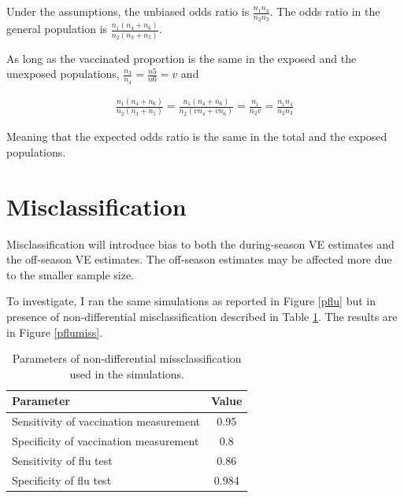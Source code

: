 \documentclass[12pt]{article}
\begin{document}
Under the assumptions, the unbiased odds ratio is $\frac{n_1n_4}{n_2n_3}$. The odds ratio in the general population is $\frac{n_1(n_4+n_6)}{n_2(n_3+n_5)}$.

As long as the vaccinated proportion is the same in the exposed and the unexposed populations, $\frac{n_3}{n_4} = \frac{n5}{n6}=v$ and

\begin{align}
\frac{n_1(n_4+n_6)}{n_2(n_3+n_5)} = \frac{n_1(n_4+n_6)}{n_2(vn_4+vn_6)}=\frac{n_1}{n_2v}=\frac{n_1n_4}{n_2n_3}
\end{align}

Meaning that the expected odds ratio is the same in the total and the exposed populations.

\pagebreak
%
\section{Misclassification} \label{miss}

Misclassification will introduce bias to both the during-season VE estimates and the off-season VE estimates. The off-season estimates may be affected more due to the smaller sample size.

To investigate, I ran the same simulations as reported in Figure \ref{pflu} but in presence of non-differential misclassification described in Table \ref{misstable}. The results are in Figure \ref{pflumiss}.

\begin{table}[htp]
\centering
\caption{
	Parameters of non-differential missclassification used in the simulations.
	\label{misstable}
}
\begin{tabular}{lc}
	\toprule
	Parameter & Value \\
	\midrule
	Sensitivity of vaccination measurement & 0.95 \\
	Specificity of vaccination measurement & 0.8  \\
	Sensitivity of flu test  & 0.86 \\
	Specificity of flu test  & 0.984 \\
	\bottomrule
\end{tabular}
\end{table}
\end{document}
